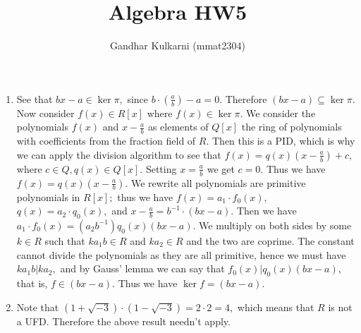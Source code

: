 \documentclass{article}
\title{Algebra HW5} %
\author{Gandhar Kulkarni (mmat2304)} %
\date{} %
\begin{document}
\maketitle %


\section{} %
\begin{enumerate}
	\item See that $bx-a \in \ker \pi,$ since $b \cdot \left( \frac{a}{b} \right)-a=0.$ Therefore $(bx-a) \subseteq \ker \pi.$ Now consider $f(x) \in R[x]$ where $f(x) \in \ker \pi.$ We consider the polynomials $f(x)$ and $x-\frac{a}{b}$ as elements of $Q[x]$ the ring of polynomials with coefficients from the fraction field of $R.$ Then this is a PID, which is why we can apply the division algorithm to see that $f(x)=q(x)\left(x-\frac{a}{b}\right)+c,$ where $c \in Q, q(x) \in Q[x].$ Setting $x=\frac{a}{b}$ we get $c=0.$ Thus we have $f(x)=q(x)\left(x-\frac{a}{b}\right).$ We rewrite all polynomials are primitive polynomials in $R[x];$ thus we have $f(x)=a_1 \cdot f_0(x),$ $q(x)=a_2 \cdot q_0(x),$ and $x-\frac{a}{b}=b^{-1} \cdot (bx-a).$ Then we have $ a_1 \cdot f_0(x)= (a_2b^{-1}) q_0(x) (bx-a).$ We multiply on both sides by some $k \in R$ such that $ka_1b \in R $ and $ ka_2 \in R$ and the two are coprime. The constant cannot divide the polynomials as they are all primitive, hence we must have $ka_1b  |  ka_2,$ and by Gauss' lemma we can say that $f_0(x) | q_0(x)(bx-a),$ that is, $f \in (bx-a).$ Thus we have $\ker f=(bx-a).$
	
	\item Note that $(1+\sqrt{-3})\cdot (1-\sqrt{-3})=2 \cdot 2 = 4,$ which means that $R$ is not a UFD. Therefore the above result needn't apply. 
\end{enumerate}
\section{} %
\end{document}
